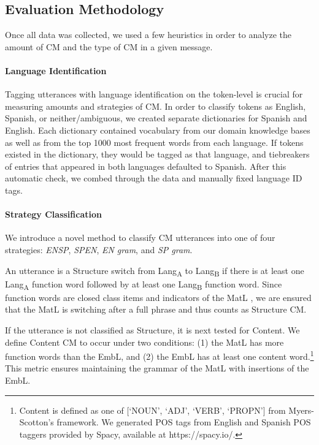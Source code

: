 \documentclass[11pt,a4paper]{article}
\newcommand{\ea}[1]{\textcolor{blue}{\bf\small [#1 --EA]}}
\newcommand{\yt}[1]{\textcolor{cyan}{\bf\small [#1 --YT]}}
\begin{document}
\subsection{Evaluation Methodology}
\label{ssec:eval_method}
Once all data was collected, we used a few heuristics in order to analyze the amount of CM and the type of CM in a given message.

\paragraph{Language Identification}
Tagging utterances with language identification on the token-level is crucial for measuring amounts and strategies of CM.
In order to classify tokens as English, Spanish, or neither/ambiguous, we created separate dictionaries for Spanish and English.
Each dictionary contained vocabulary from our domain knowledge bases as well as from the top 1000 most frequent words from each language.
If tokens existed in the dictionary, they would be tagged as that language, and tiebreakers of entries that appeared in both languages defaulted to Spanish. 
After this automatic check, we combed through the data and manually fixed language ID tags.

\paragraph{Strategy Classification}
We introduce a novel method to classify CM utterances into one of four strategies:  \textit{EN\textrightarrow SP}, \textit{SP\textrightarrow EN}, \textit{EN gram}, and \textit{SP gram}.

An utterance is a Structure switch from Lang\textsubscript{A} to Lang\textsubscript{B} if there is at least one Lang\textsubscript{A} function word followed by at least one Lang\textsubscript{B} function word.
Since function words are closed class items and indicators of the MatL \citep{Joshi1982}, we are ensured that the MatL is switching after a full phrase and thus counts as Structure CM.

If the utterance is not classified as Structure, it is next tested for Content.
We define Content CM to occur under two conditions: (1) the MatL has more function words than the EmbL, and (2) the EmbL has at least one content word.\footnote{Content is defined as one of [`NOUN', `ADJ', `VERB', `PROPN'] from Myers-Scotton's framework. We generated POS tags from English and Spanish POS taggers provided by Spacy, available at https://spacy.io/.}
This metric ensures maintaining the grammar of the MatL with insertions of the EmbL.
\end{document}
